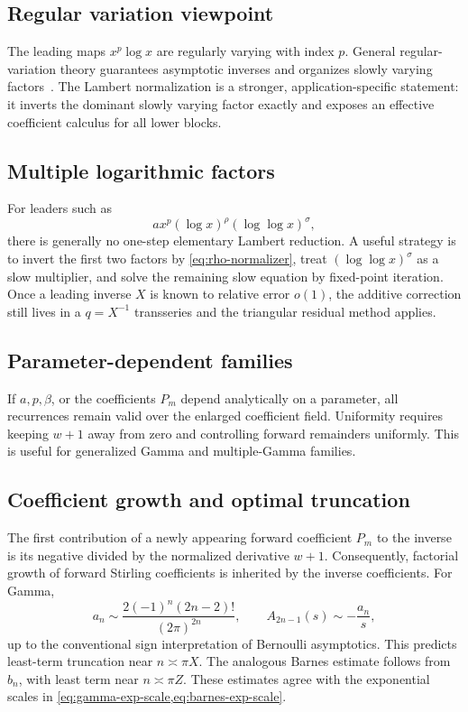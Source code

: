 \documentclass[11pt,a4paper]{article}
\numberwithin{equation}{section}
\theoremstyle{definition}
\theoremstyle{remark}
\begin{document}
\subsection{Regular variation viewpoint}

The leading maps \(x^p\log x\) are regularly varying with index \(p\).
General regular-variation theory guarantees asymptotic inverses and
organizes slowly varying factors~\cite{BGT}.  The Lambert normalization is
a stronger, application-specific statement: it inverts the dominant slowly
varying factor exactly and exposes an effective coefficient calculus for
all lower blocks.

\subsection{Multiple logarithmic factors}

For leaders such as
\begin{equation}
 a x^p(\log x)^\rho(\log\log x)^\sigma,
 \label{eq:multiple-log-leader}
\end{equation}
there is generally no one-step elementary Lambert reduction.  A useful
strategy is to invert the first two factors by \cref{eq:rho-normalizer},
treat \((\log\log x)^\sigma\) as a slow multiplier, and solve the remaining
slow equation by fixed-point iteration.  Once a leading inverse \(X\) is
known to relative error \(o(1)\), the additive correction still lives in a
\(q=X^{-1}\) transseries and the triangular residual method applies.

\subsection{Parameter-dependent families}

If \(a,p,\beta\), or the coefficients \(P_m\) depend analytically on a
parameter, all recurrences remain valid over the enlarged coefficient
field.  Uniformity requires keeping \(w+1\) away from zero and controlling
forward remainders uniformly.  This is useful for generalized Gamma and
multiple-Gamma families.

\subsection{Coefficient growth and optimal truncation}

The first contribution of a newly appearing forward coefficient \(P_m\)
to the inverse is its negative divided by the normalized derivative
\(w+1\).  Consequently, factorial growth of forward Stirling coefficients
is inherited by the inverse coefficients.  For Gamma,
\begin{equation}
 a_n\sim
 \frac{2(-1)^n(2n-2)!}{(2\pi)^{2n}},
 \qquad
 A_{2n-1}(s)\sim-\frac{a_n}{s},
 \label{eq:gamma-growth}
\end{equation}
up to the conventional sign interpretation of Bernoulli asymptotics.
This predicts least-term truncation near \(n\asymp\pi X\).  The analogous
Barnes estimate follows from \(b_n\), with least term near
\(n\asymp\pi Z\).  These estimates agree with the exponential scales in
\cref{eq:gamma-exp-scale,eq:barnes-exp-scale}.
\end{document}
